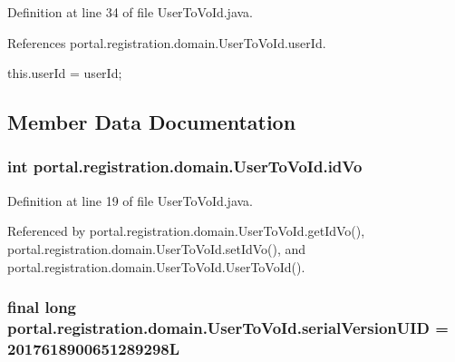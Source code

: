 Definition at line 34 of file UserToVoId.java.



References portal.registration.domain.UserToVoId.userId.


\begin{DoxyCode}
                                          {
                this.userId = userId;
        }
\end{DoxyCode}


\subsection{Member Data Documentation}
\hypertarget{classportal_1_1registration_1_1domain_1_1UserToVoId_ac0376a39a3931654327d2723ad3fcc02}{
\subsubsection[{idVo}]{\setlength{\rightskip}{0pt plus 5cm}int {\bf portal.registration.domain.UserToVoId.idVo}}}
\label{classportal_1_1registration_1_1domain_1_1UserToVoId_ac0376a39a3931654327d2723ad3fcc02}


Definition at line 19 of file UserToVoId.java.



Referenced by portal.registration.domain.UserToVoId.getIdVo(), portal.registration.domain.UserToVoId.setIdVo(), and portal.registration.domain.UserToVoId.UserToVoId().

\hypertarget{classportal_1_1registration_1_1domain_1_1UserToVoId_a666f56a9e397d6b312b0131a48156d38}{
\subsubsection[{serialVersionUID}]{\setlength{\rightskip}{0pt plus 5cm}final long {\bf portal.registration.domain.UserToVoId.serialVersionUID} = 2017618900651289298L}}
\label{classportal_1_1registration_1_1domain_1_1UserToVoId_a666f56a9e397d6b312b0131a48156d38}


